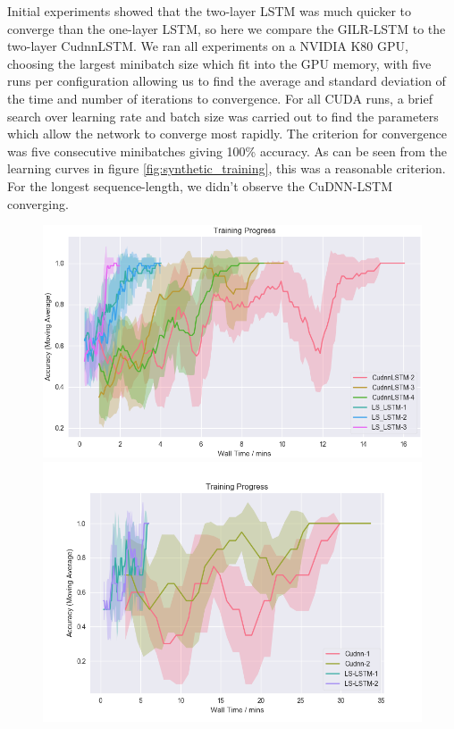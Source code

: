 \documentclass{article}
\begin{document}
Initial experiments showed that the two-layer LSTM was much quicker to converge
than the one-layer LSTM, so here we compare the GILR-LSTM to the two-layer
CudnnLSTM.  We ran all experiments on a NVIDIA K80 GPU, choosing the largest
minibatch size which fit into the GPU memory, with five runs per configuration
allowing us to find the average and standard deviation of the time and number of
iterations to convergence. For all CUDA runs, a brief search over learning rate
and batch size was carried out to find the parameters which allow the network to
converge most rapidly. The criterion for convergence was five consecutive
minibatches giving 100\% accuracy. As can be seen from the learning curves
in figure \ref{fig:synthetic_training}, this was a reasonable criterion. For the
longest sequence-length, we didn't observe the CuDNN-LSTM converging.
\begin{figure}
  \centering
  \begin{minipage}{0.5\textwidth}
    \includegraphics[width=1.0\textwidth]{./1k_synthetic.png}
  \end{minipage}%
    \begin{minipage}{0.5\textwidth}
    \includegraphics[width=1.0\textwidth]{./8k_synthetic.png}      

\end{minipage}
\end{figure}
\end{document}
